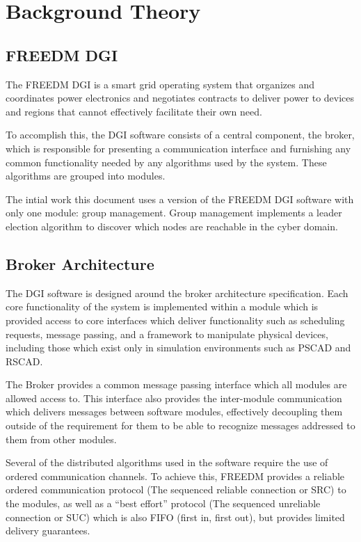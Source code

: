 \chapter{Background Theory}
\section{FREEDM DGI}
The FREEDM DGI is a smart grid operating system that organizes and coordinates 
power electronics and negotiates contracts to deliver power to devices and 
regions that cannot effectively facilitate their own need.

To accomplish this, the DGI software consists of a central component, the 
broker, which is responsible for presenting a communication interface and 
furnishing any common functionality needed by any algorithms used by the 
system. These algorithms are grouped into modules.

The intial work this document uses a version of the FREEDM DGI software with 
only one module: group management. Group management implements a leader
election algorithm to discover which nodes are reachable in the cyber domain.

\section{Broker Architecture}

The DGI software is designed around the broker architecture specification. Each 
core functionality of the system is implemented within a module 
which is provided access to core interfaces which deliver functionality such as 
scheduling requests, message passing, and a framework to manipulate physical 
devices, including those which exist only in simulation environments such as 
PSCAD\cite{PSCAD} and RSCAD\cite{RSCAD}.

The Broker provides a common message passing interface which all modules are 
allowed access to. This interface also provides the inter-module communication 
which delivers messages between software modules, effectively decoupling them 
outside of the requirement for them to be able to recognize messages addressed 
to them from other modules.

Several of the distributed algorithms used in the software require the use of 
ordered communication channels. To achieve this, FREEDM provides a reliable 
ordered communication protocol (The sequenced reliable connection or SRC) to 
the modules, as well as a ``best effort'' protocol (The sequenced unreliable 
connection or SUC) which is also FIFO (first in, first out), but provides 
limited delivery guarantees.

